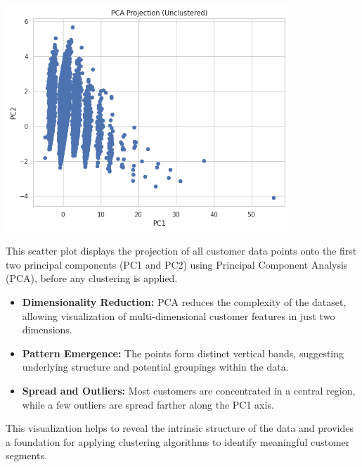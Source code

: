 \documentclass[a4paper]{article}
\begin{document}
\begin{multicols}{2}
\noindent
\begin{minipage}{\columnwidth}
\centering
\includegraphics[width=0.8\textwidth]{PCA Projection (Unclustered).png}
\label{fig:pca_unclustered}
\end{minipage}

This scatter plot displays the projection of all customer data points onto the first two principal components (PC1 and PC2) using Principal Component Analysis (PCA), before any clustering is applied.

\begin{itemize}
    \item \textbf{Dimensionality Reduction:} PCA reduces the complexity of the dataset, allowing visualization of multi-dimensional customer features in just two dimensions.
    \item \textbf{Pattern Emergence:} The points form distinct vertical bands, suggesting underlying structure and potential groupings within the data.
    \item \textbf{Spread and Outliers:} Most customers are concentrated in a central region, while a few outliers are spread farther along the PC1 axis.
\end{itemize}

This visualization helps to reveal the intrinsic structure of the data and provides a foundation for applying clustering algorithms to identify meaningful customer segments.

\vspace{1em}


\end{multicols}
\end{document}

